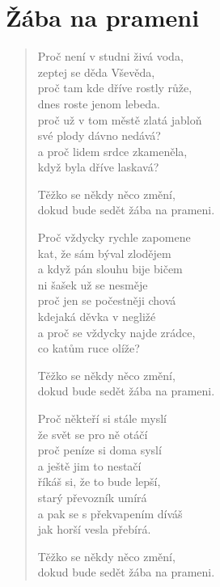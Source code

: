 \section{Žába na prameni}

\thispagestyle{empty}

\begin{multicols}{2}
	
\begin{verse}
		
Proč není v studni živá voda,\\
zeptej se děda Vševěda,\\
proč tam kde dříve rostly růže,\\
dnes roste jenom lebeda.\\
proč už v tom městě zlatá jabloň\\
své plody dávno nedává?\\
a proč lidem srdce zkameněla,\\
když byla dříve laskavá?

Těžko se někdy něco změní,\\
dokud bude sedět žába na prameni.

Proč vždycky rychle zapomene\\
kat, že sám býval zlodějem\\
a když pán slouhu bije bičem\\
ni šašek už se nesměje\\
proč jen se počestněji chová\\
kdejaká děvka v negližé\\
a proč se vždycky najde zrádce,\\
co katům ruce olíže?

Těžko se někdy něco změní,\\
dokud bude sedět žába na prameni.

\columnbreak

Proč někteří si stále myslí\\
že svět se pro ně otáčí\\
proč peníze si doma syslí\\
a ještě jim to nestačí\\
říkáš si, že to bude lepší,\\
starý převozník umírá\\
a pak se s překvapením díváš\\
jak horší vesla přebírá.

Těžko se někdy něco změní,\\
dokud bude sedět žába na prameni.		
	
\end{verse}
	
\end{multicols}